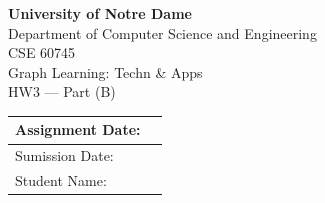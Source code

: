 \thispagestyle{plain}
\begin{center}
    \vspace*{2.2cm}
    {\LARGE\bfseries University of Notre Dame}\\[0.6em]
    {\Large Department of Computer Science and Engineering}\\[2.6cm]
    {\Large CSE 60745}\\[0.5em]
    {\Large Graph Learning: Techn \& Apps}\\[0.4em]
    {\large HW3 --- Part (B)}\\[1.8cm]

    \setlength{\extrarowheight}{10pt}
    \begin{tabular}{|p{}|p{}|}
        \hline
        Assignment Date: & \\[0.9em]
        \hline
        Sumission Date:  & \\[0.9em]
        \hline
        Student Name:    & \\[0.9em]
        \hline
    \end{tabular}
\end{center}
\clearpage
